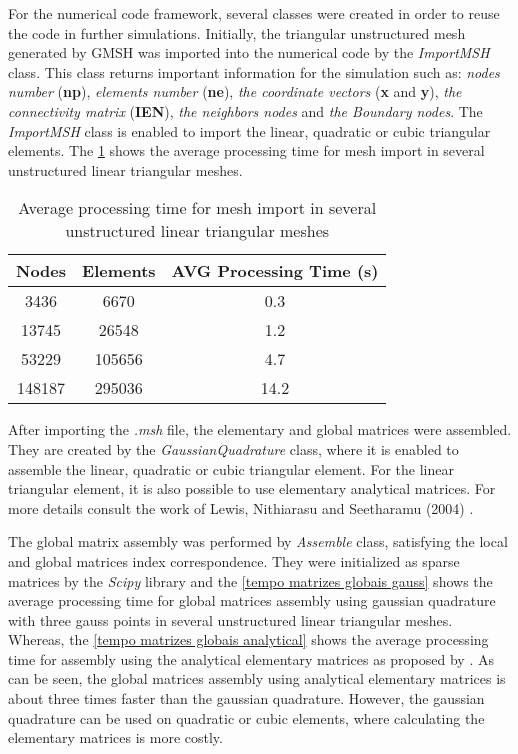 For the numerical code framework, several classes were created in 
order to reuse the code in further simulations. 
Initially, the triangular unstructured mesh generated by GMSH \cite{gmsh}
was imported into the numerical code by the \textit{ImportMSH} class.
This class returns important information for the simulation 
such as:
\textit{nodes number} (\textbf{np}), 
\textit{elements number} (\textbf{ne}), 
\textit{the coordinate vectors} (\textbf{x} and \textbf{y}), 
\textit{the connectivity matrix} (\textbf{IEN}),
\textit{the neighbors nodes} and 
\textit{the Boundary nodes}. 
The \textit{ImportMSH} class is 
enabled to import the linear, quadratic or cubic triangular elements.
The \ref{tempo malha} shows the average processing time for 
mesh import in several unstructured linear triangular meshes.

\vspace{0.5cm}
\begin{table}[H]
\centering
\begin{tabular}{ccc}
\toprule
\textbf{Nodes} & \textbf{Elements} & \textbf{AVG Processing Time} (s) \\
\midrule
3436 & 6670 & 0.3 \\
13745 & 26548 & 1.2 \\
53229 & 105656 & 4.7 \\
148187 & 295036 & 14.2 \\
\bottomrule
\end{tabular}
\caption{Average processing time for mesh import in several unstructured linear triangular meshes}
\label{tempo malha}
\end{table}

\medskip
After importing the \textit{.msh} file, the elementary and global matrices 
were assembled. 
They are created by the \textit{GaussianQuadrature} class, where it is enabled to assemble the linear, quadratic or cubic triangular element.
For the linear 
triangular element, it is also possible to use elementary 
analytical matrices. For more details consult the work of Lewis, 
Nithiarasu and Seetharamu (2004) \cite{lewis2004}.

\medskip
The global matrix assembly was performed by \textit{Assemble} class, satisfying the local and global matrices index correspondence.
They were initialized as sparse matrices by 
the \textit{Scipy} library \cite{scipy} and 
the \ref{tempo matrizes globais gauss} shows the average processing time 
for global matrices assembly using gaussian quadrature 
with three gauss points in several unstructured linear 
triangular meshes. Whereas, the \ref{tempo matrizes globais analytical}
shows the average processing time for assembly using the analytical
elementary matrices as proposed by \cite{lewis2004}. As can be seen,
the global matrices assembly using analytical elementary matrices is
about three times faster than the gaussian quadrature. However, the gaussian quadrature
can be used on quadratic or cubic elements, where calculating
the elementary matrices is more costly.

